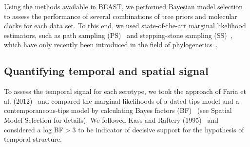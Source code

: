 \documentclass[10pt]{article}
\begin{document}
Using the methods available in BEAST, we performed Bayesian model selection to assess the performance of several combinations of tree priors and molecular clocks for each data set.
To this end, we used state-of-the-art marginal likelihood estimators, such as path sampling (PS)~\cite{LartillotPhilippe} and stepping-stone sampling (SS)~\cite{Xie}, which have only recently been introduced in the field of phylogenetics~\cite{LartillotPhilippe,Xie,Baele2012,Baele2013a,Baele2013b}.

\subsection*{Quantifying temporal and spatial signal} 

To assess the temporal signal for each serotype, we took the approach of Faria et al. (2012)~\cite{Faria2012} and compared the marginal likelihoods of a dated-tips model and a contemporaneous-tips model by calculating Bayes factors (BF)~\cite{Suchard2001,suchard2005models} (see Spatial Model Selection for details).
We followed Kass and Raftery (1995)~\cite{KassRaftery1995} and considered a log BF$>$3 to be indicator of decisive support for the hypothesis of temporal structure.
\end{document}
